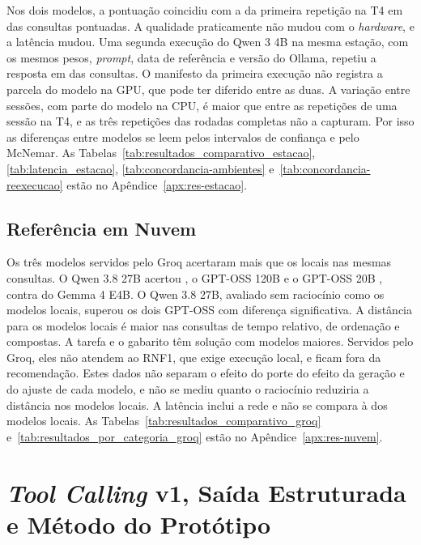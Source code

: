 Nos dois modelos, a pontuação coincidiu com a da primeira repetição na T4 em  das  consultas pontuadas. A qualidade praticamente não mudou com o \textit{hardware}, e a latência mudou. Uma segunda execução do Qwen 3 4B na mesma estação, com os mesmos pesos, \textit{prompt}, data de referência e versão do Ollama, repetiu a resposta em  das  consultas. O manifesto da primeira execução não registra a parcela do modelo na GPU, que pode ter diferido entre as duas. A variação entre sessões, com parte do modelo na CPU, é maior que entre as repetições de uma sessão na T4, e as três repetições das rodadas completas não a capturam. Por isso as diferenças entre modelos se leem pelos intervalos de confiança e pelo McNemar. As Tabelas~\ref{tab:resultados_comparativo_estacao}, \ref{tab:latencia_estacao}, \ref{tab:concordancia-ambientes} e~\ref{tab:concordancia-reexecucao} estão no Apêndice~\ref{apx:res-estacao}.

\subsection{Referência em Nuvem}
\label{sec:referencia-nuvem}

Os três modelos servidos pelo Groq acertaram mais que os locais nas mesmas consultas. O Qwen 3.8 27B acertou , o GPT-OSS 120B  e o GPT-OSS 20B , contra  do Gemma 4 E4B. O Qwen 3.8 27B, avaliado sem raciocínio como os modelos locais, superou os dois GPT-OSS com diferença significativa. A distância para os modelos locais é maior nas consultas de tempo relativo, de ordenação e compostas. A tarefa e o gabarito têm solução com modelos maiores. Servidos pelo Groq, eles não atendem ao RNF1, que exige execução local, e ficam fora da recomendação. Estes dados não separam o efeito do porte do efeito da geração e do ajuste de cada modelo, e não se mediu quanto o raciocínio reduziria a distância nos modelos locais. A latência inclui a rede e não se compara à dos modelos locais. As Tabelas~\ref{tab:resultados_comparativo_groq} e~\ref{tab:resultados_por_categoria_groq} estão no Apêndice~\ref{apx:res-nuvem}.

\section{\texorpdfstring{\textit{Tool Calling}}{Tool Calling} v1, Saída Estruturada e Método do Protótipo}
\label{sec:abordagens}

